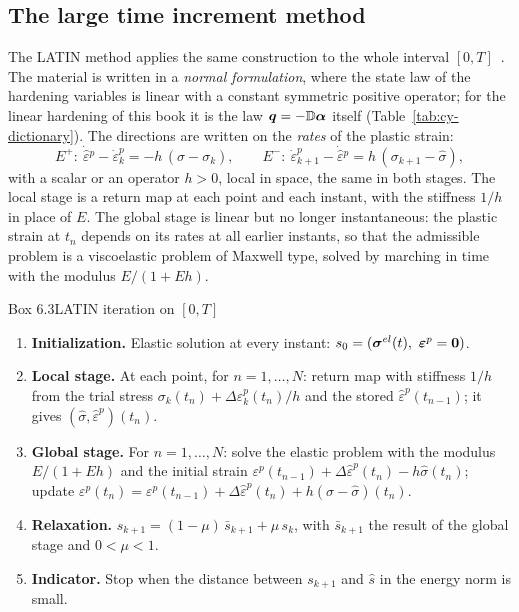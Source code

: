 \subsection{The large time increment method}\label{ssec:cy-latin}
%
The LATIN method applies the same construction to the whole interval
$[0,T]$~\cite{LadevezeNCSM,BoisseBussyLadeveze1990}. The material is written in
a \emph{normal formulation}, where the state law of the hardening variables is
linear with a constant symmetric positive operator; for the linear hardening of
this book it is the law $\bm{q}=-\mathbb{D}\bm{\alpha}$ itself (Table~\ref{tab:cy-dictionary}).
The directions are written on the \emph{rates} of the plastic strain:
\begin{equation}\label{eq:cy-latin-dir}
  E^+:\ \dot{\hat\varepsilon}{}^p-\dot\varepsilon^p_k=-h\,(\hat\sigma-\sigma_k),
  \qquad
  E^-:\ \dot\varepsilon^p_{k+1}-\dot{\hat\varepsilon}{}^p=h\,(\sigma_{k+1}-\hat\sigma),
\end{equation}
with a scalar or an operator $h>0$, local in space, the same in both stages.
The local stage is a return map at each point and each instant, with the
stiffness $1/h$ in place of $E$. The global stage is linear but no longer
instantaneous: the plastic strain at $t_n$ depends on its rates at all earlier
instants, so that the admissible problem is a viscoelastic problem of Maxwell
type, solved by marching in time with the modulus $E/(1+Eh)$.

\begin{gbox}{Box 6.3\quad LATIN iteration on $[0,T]$}
%
\begin{enumerate}[label=\textbf{\arabic*.},leftmargin=1.6em]
  \item \textbf{Initialization.} Elastic solution at every instant:
  $s_0=(\sig^{el}(t),\ \epsp=\vzero)$.
  \item \textbf{Local stage.} At each point, for $n=1,\dots,N$: return map
  with stiffness $1/h$ from the trial stress
  $\sigma_k(t_n)+\Delta\varepsilon^p_k(t_n)/h$ and the stored
  $\hat\varepsilon^p(t_{n-1})$; it gives $(\hat\sigma,\hat\varepsilon^p)(t_n)$.
  \item \textbf{Global stage.} For $n=1,\dots,N$: solve the elastic problem with
  the modulus $E/(1+Eh)$ and the initial strain
  $\varepsilon^p(t_{n-1})+\Delta\hat\varepsilon^p(t_n)-h\hat\sigma(t_n)$; update
  $\varepsilon^p(t_n)=\varepsilon^p(t_{n-1})+\Delta\hat\varepsilon^p(t_n)+h(\sigma-\hat\sigma)(t_n)$.
  \item \textbf{Relaxation.} $s_{k+1}=(1-\mu)\,\bar s_{k+1}+\mu\,s_k$, with
  $\bar s_{k+1}$ the result of the global stage and $0<\mu<1$.
  \item \textbf{Indicator.} Stop when the distance between $s_{k+1}$ and
  $\hat s$ in the energy norm is small.
\end{enumerate}
\end{gbox}

